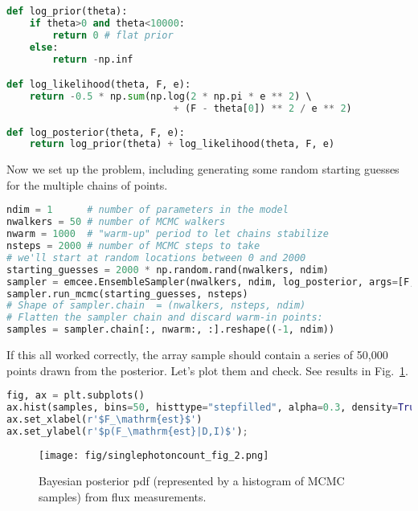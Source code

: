 \documentclass[%
oneside,                 %
final,                   %
10pt]{article}
\begin{document}
\begin{lstlisting}[language=Python,style=blue1]
def log_prior(theta):
    if theta>0 and theta<10000:
        return 0 # flat prior
    else:
        return -np.inf

def log_likelihood(theta, F, e):
    return -0.5 * np.sum(np.log(2 * np.pi * e ** 2) \ 
                             + (F - theta[0]) ** 2 / e ** 2)
                             
def log_posterior(theta, F, e):
    return log_prior(theta) + log_likelihood(theta, F, e)
\end{lstlisting}

Now we set up the problem, including generating some random starting guesses for the multiple chains of points.

\begin{lstlisting}[language=Python,style=blue1]
ndim = 1      # number of parameters in the model
nwalkers = 50 # number of MCMC walkers
nwarm = 1000  # "warm-up" period to let chains stabilize
nsteps = 2000 # number of MCMC steps to take
# we'll start at random locations between 0 and 2000
starting_guesses = 2000 * np.random.rand(nwalkers, ndim)
sampler = emcee.EnsembleSampler(nwalkers, ndim, log_posterior, args=[F,e])
sampler.run_mcmc(starting_guesses, nsteps)
# Shape of sampler.chain  = (nwalkers, nsteps, ndim)
# Flatten the sampler chain and discard warm-in points:
samples = sampler.chain[:, nwarm:, :].reshape((-1, ndim))
\end{lstlisting}

If this all worked correctly, the array sample should contain a series of 50,000 points drawn from the posterior. Let's plot them and check. See results in Fig.~\ref{fig:flux-bayesian}.

\begin{lstlisting}[language=Python,style=blue1]
fig, ax = plt.subplots()
ax.hist(samples, bins=50, histtype="stepfilled", alpha=0.3, density=True)
ax.set_xlabel(r'$F_\mathrm{est}$')
ax.set_ylabel(r'$p(F_\mathrm{est}|D,I)$');
\end{lstlisting}

\begin{figure}[!ht]  %
  \centerline{\texttt{[image: fig/singlephotoncount\_fig\_2.png]}}
  \caption{
  Bayesian posterior pdf (represented by a histogram of MCMC samples) from flux measurements. \label{fig:flux-bayesian}
  }
\end{figure}
\end{document}
